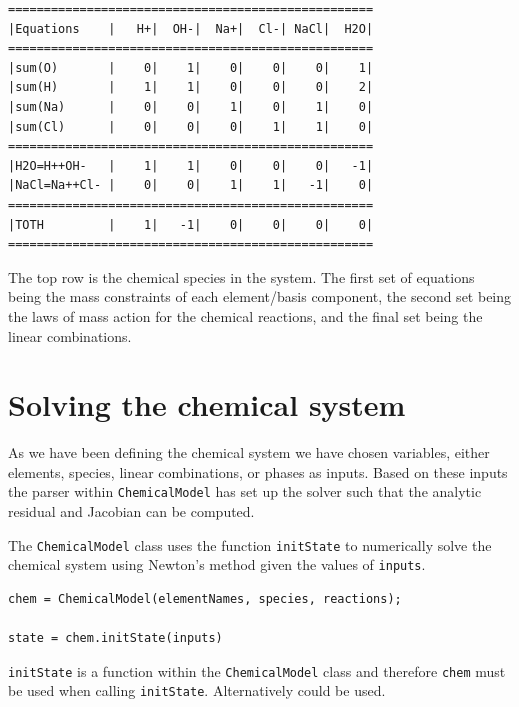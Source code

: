 \documentclass{article}
\begin{document}
\begin{lstlisting}
===================================================
|Equations    |   H+|  OH-|  Na+|  Cl-| NaCl|  H2O|
===================================================
|sum(O)       |    0|    1|    0|    0|    0|    1|
|sum(H)       |    1|    1|    0|    0|    0|    2|
|sum(Na)      |    0|    0|    1|    0|    1|    0|
|sum(Cl)      |    0|    0|    0|    1|    1|    0|
===================================================
|H2O=H++OH-   |    1|    1|    0|    0|    0|   -1|
|NaCl=Na++Cl- |    0|    0|    1|    1|   -1|    0|
===================================================
|TOTH         |    1|   -1|    0|    0|    0|    0|
===================================================
\end{lstlisting}
The top row is the chemical species in the system. The first set of equations being the mass constraints of each element/basis component, the second set being the laws of mass action for the chemical reactions, and the final set being the linear combinations. 


\section{Solving the chemical system}
As we have been defining the chemical system we have chosen variables, either elements, species, linear combinations, or phases as inputs. Based on these inputs the parser within \verb|ChemicalModel| has set up the solver such that the analytic residual and Jacobian can be computed.

The \verb|ChemicalModel| class uses the function \verb|initState| to numerically solve the chemical system using Newton's method given the values of \verb|inputs|. 

\begin{lstlisting}
chem = ChemicalModel(elementNames, species, reactions);

state = chem.initState(inputs)
\end{lstlisting}
\verb|initState| is a function within the \verb|ChemicalModel| class and therefore \verb|chem| must be used when calling \verb|initState|. Alternatively  could be used. 
\end{document}
